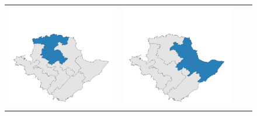 \begin{figure}[p]
\begin{tabularx}{1\textwidth}{XXXX}
\includegraphics[width=1\linewidth]{images/ch6/mergeoverall/19}&
\includegraphics[width=1\linewidth]{images/ch6/mergeoverall/20} \\

\end{tabularx}
\end{figure}
